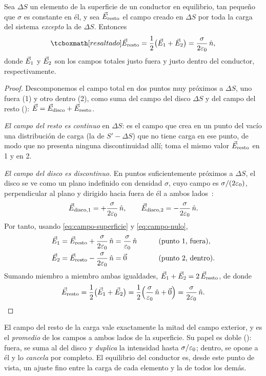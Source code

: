 \begin{lema}\label{lem:resto}
Sea $\Delta S$ un elemento de la superficie de un conductor en equilibrio, tan pequeño que $\sigma$ es constante en él, y sea $\vec{E}_{\mathrm{resto}}$ el campo
creado en $\Delta S$ por toda la carga del sistema \emph{excepto} la de $\Delta S$. Entonces
\begin{equation}\label{eq:campo-resto}
  \resalta{\Erest=\frac12\bigl(\vE_1+\vE_2\bigr)=\frac{\sigma}{2\eo}\,\un ,}
\end{equation}
donde $\vec{E}_1$ y $\vec{E}_2$ son los campos totales justo fuera y justo dentro del conductor, respectivamente.
\end{lema}
\begin{proof}
Descomponemos el campo total en dos puntos muy próximos a $\Delta S$, uno fuera (1) y otro dentro (2), como suma del campo del disco $\Delta S$ y
del campo del resto (): $\vec{E}=\vec{E}_{\mathrm{disco}}+\vec{E}_{\mathrm{resto}}$.

\emph{El campo del resto es continuo} en $\Delta S$: es el campo que crea en un punto del vacío una distribución de carga (la de $S'-\Delta S$) que
no tiene carga en ese punto, de modo que no presenta ninguna discontinuidad allí; toma el mismo valor $\vec{E}_{\mathrm{resto}}$ en 1 y en 2.

\emph{El campo del disco es discontinuo.} En puntos suficientemente próximos a $\Delta S$, el disco se ve como un plano indefinido con densidad
$\sigma$, cuyo campo es $\sigma/(2\varepsilon_{0})$, perpendicular al plano y dirigido hacia fuera de él a ambos lados~\cite{TEMA1}:
\[
  \vec{E}_{\mathrm{disco},1}=+\frac{\sigma}{2\varepsilon_{0}}\,\hat{n},\qquad\vec{E}_{\mathrm{disco},2}=-\frac{\sigma}{2\varepsilon_{0}}\,\hat{n} .
\]
Por tanto, usando \cref{eq:campo-superficie} y \cref{eq:campo-nulo},
\begin{alignat*}{2}
  \vec{E}_1&=\vec{E}_{\mathrm{resto}}+\frac{\sigma}{2\varepsilon_{0}}\,\hat{n}=\frac{\sigma}{\varepsilon_{0}}\,\hat{n} &\qquad&\text{(punto 1, fuera)},\\
  \vec{E}_2&=\vec{E}_{\mathrm{resto}}-\frac{\sigma}{2\varepsilon_{0}}\,\hat{n}=\vec{0} &&\text{(punto 2, dentro)}.
\end{alignat*}
Sumando miembro a miembro ambas igualdades, $\vec{E}_1+\vec{E}_2=2\,\vec{E}_{\mathrm{resto}}$, de donde
\[
  \vec{E}_{\mathrm{resto}}=\frac12\bigl(\vec{E}_1+\vec{E}_2\bigr)=\frac12\Bigl(\frac{\sigma}{\varepsilon_{0}}\,\hat{n}+\vec{0}\Bigr)=\frac{\sigma}{2\varepsilon_{0}}\,\hat{n} .
\]
\end{proof}

\begin{observacion}\label{obs:resto}
El campo del resto de la carga vale exactamente la mitad del campo exterior, y es el \emph{promedio} de los campos a ambos lados de la superficie.
Su papel es doble (): fuera, se suma al del disco y \emph{duplica} la intensidad hasta $\sigma/\varepsilon_{0}$; dentro, se opone a él y lo
\emph{cancela} por completo. El equilibrio del conductor es, desde este punto de vista, un ajuste fino entre la carga de cada elemento y la de todos
los demás.
\end{observacion}

